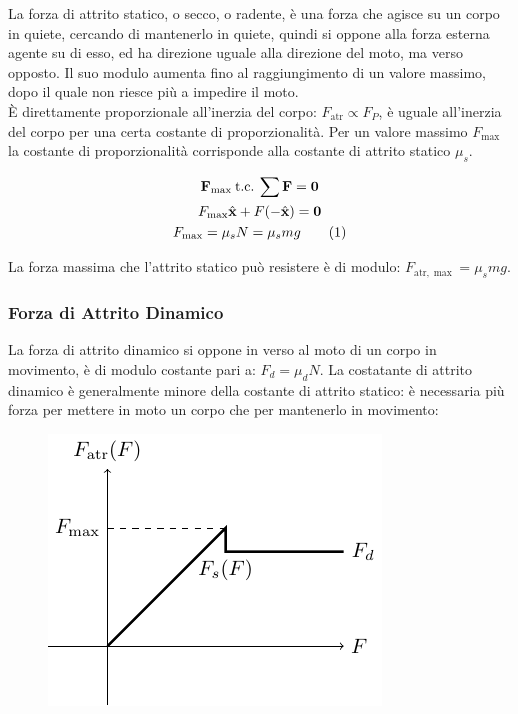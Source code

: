 \documentclass{article}
\newcommand{\vect}[1]{\boldsymbol{\mathbf{#1}}}
\numberwithin{equation}{subsection}
\begin{document}
La forza di attrito statico, o secco, o radente, è una forza 
che agisce su un corpo in quiete, cercando di mantenerlo in 
quiete, quindi si oppone alla forza esterna agente su di esso, 
ed ha direzione uguale alla direzione del moto, ma verso 
opposto. Il suo modulo aumenta fino al raggiungimento di 
un valore massimo, dopo il quale non riesce più a impedire 
il moto.
\\
\`{E} direttamente proporzionale all'inerzia del corpo: $F_\mathrm{atr}\propto F_P$, è uguale all'inerzia del corpo per una certa costante di proporzionalità. Per un valore massimo 
$F_{\max}$ la costante di proporzionalità corrisponde alla costante di attrito statico $\mu_s$. 

\begin{gather*}
    \vect{F}_{\max}\:\mbox{t.c.}\:\sum\vect{F}=\vect{0}\\
    F_{\max}\hat{\vect{x}}+F(-\hat{\vect{x}})=\vect{0}\\
    F_{\max}=\mu_sN=\mu_smg\tag{\stepcounter{equation}\theequation}
\end{gather*}

La forza massima che l'attrito statico può resistere è 
di modulo: $F_{\mathrm{atr},\max}=\mu_smg$.

\subsubsection{Forza di Attrito Dinamico}
La forza di attrito dinamico si oppone in verso al moto di un corpo 
in movimento, è di modulo costante pari a: $F_d=\mu_dN$. La 
costatante di attrito dinamico è generalmente minore della 
costante di attrito statico: è necessaria più forza per 
mettere in moto un corpo che per mantenerlo in movimento:

\begin{figure}[H]%
    \centering
    \includegraphics{andamento-attrito.pdf}%
\end{figure}
\end{document}

